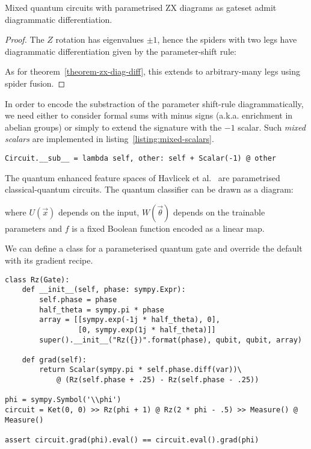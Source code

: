 \begin{corollary}
Mixed quantum circuits with parametrised ZX diagrams as gateset admit diagrammatic differentiation.
\end{corollary}

\begin{proof}
The $Z$ rotation has eigenvalues $\pm 1$, hence the spiders with two legs have
diagrammatic differentiation given by the parameter-shift rule:


As for theorem~\ref{theorem-zx-diag-diff}, this extends to
arbitrary-many legs using spider fusion.
\end{proof}

\begin{remark}
In order to encode the substraction of the parameter shift-rule diagrammatically, we
need either to consider formal sums with minus signs (a.k.a. enrichment in
abelian groups) or simply to extend the signature with the $-1$ scalar.
Such \emph{mixed scalars} are implemented in listing~\ref{listing:mixed-scalars}.

\begin{verbatim}
Circuit.__sub__ = lambda self, other: self + Scalar(-1) @ other
\end{verbatim}
\end{remark}

\begin{example}
The quantum enhanced feature spaces of Havlicek et al.~\cite{HavlicekEtAl19} are parametrised
classical-quantum circuits.
The quantum classifier can be drawn as a diagram:


where $U(\vec{x})$ depends on the input, $W(\vec{\theta})$ depends on the
trainable parameters and $f$ is a fixed Boolean function encoded as a linear map.
\end{example}

\begin{example}
We can define a class for a parameterised quantum gate and override the default  with its gradient recipe.

\begin{verbatim}
class Rz(Gate):
    def __init__(self, phase: sympy.Expr):
        self.phase = phase
        half_theta = sympy.pi * phase
        array = [[sympy.exp(-1j * half_theta), 0],
                 [0, sympy.exp(1j * half_theta)]]
        super().__init__("Rz({})".format(phase), qubit, qubit, array)

    def grad(self):
        return Scalar(sympy.pi * self.phase.diff(var))\
            @ (Rz(self.phase + .25) - Rz(self.phase - .25))

phi = sympy.Symbol('\\phi')
circuit = Ket(0, 0) >> Rz(phi + 1) @ Rz(2 * phi - .5) >> Measure() @ Measure()

assert circuit.grad(phi).eval() == circuit.eval().grad(phi)
\end{verbatim}
\end{example}
